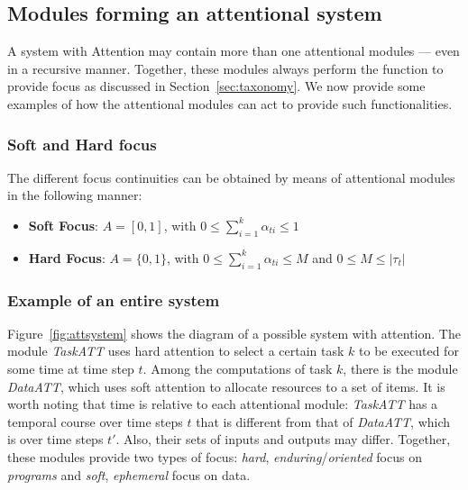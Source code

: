 \documentclass[11pt]{article}
\begin{document}
\subsection{Modules forming an attentional system}
A system with Attention may contain more than one attentional modules --- even in a recursive manner.
Together, these modules always perform the function to provide focus
as discussed in Section~\ref{sec:taxonomy}.
We now provide some examples of how the attentional modules can act to provide such functionalities.

\subsubsection{Soft and Hard focus}
The different focus continuities can be obtained by means of attentional modules in the following manner:
\begin{itemize}
    \item \textbf{Soft Focus}:
        $A = [0, 1]$, with $0 \le \sum_{i=1}^{k} \alpha_{ti} \le 1$
    \item \textbf{Hard Focus}:
        $A = \{0, 1\}$, with $0 \le \sum_{i=1}^{k} \alpha_{ti} \le M$ and $0 \le M \le |\tau_t|$
\end{itemize}

\subsubsection{Example of an entire system}
Figure~\ref{fig:attsystem} shows the diagram of a possible system with attention.
The module \emph{TaskATT} uses hard attention to select a certain task $k$ to be executed for some time at time step $t$.
Among the computations of task $k$, there is the module \emph{DataATT}, which uses soft attention to allocate resources to a set of items.
It is worth noting that time is relative to each attentional module: \emph{TaskATT} has a temporal course over time steps $t$ that is different from that of \emph{DataATT}, which is over time steps $t'$.
Also, their sets of inputs and outputs may differ.
Together, these modules provide two types of focus:
\emph{hard}, \emph{enduring}/\emph{oriented} focus on \emph{programs} and
\emph{soft}, \emph{ephemeral} focus on data.
\end{document}
